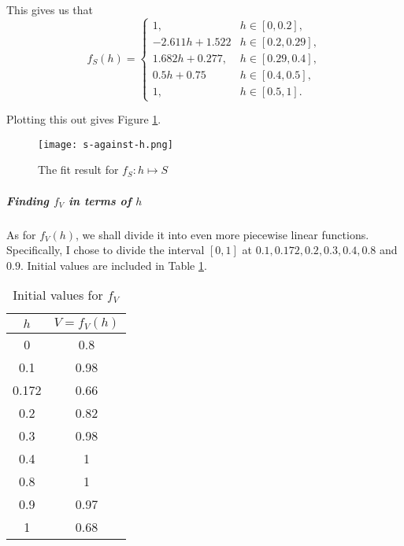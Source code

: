 This gives us that
\[
    f_S(h) = \begin{cases}
        1,              & h \in [0, 0.2],    \\
        -2.611h + 1.522 & h \in [0.2, 0.29], \\
        1.682h + 0.277, & h \in [0.29, 0.4], \\
        0.5h + 0.75     & h \in [0.4, 0.5],  \\
        1,              & h \in [0.5, 1].
    \end{cases}
\]

Plotting this out gives Figure \ref{fig:s-against-h}.

\begin{figure}[!ht]
    \centering
    \texttt{[image: s-against-h.png]}
    \caption{The fit result for \(f_S: h \mapsto S\)}
    \label{fig:s-against-h}
\end{figure}

\subparagraph{Finding \(f_V\) in terms of \(h\)}

As for \(f_V(h)\), we shall divide it into even more piecewise linear functions. Specifically, I chose to divide the interval \([0, 1]\) at \(0.1, 0.172, 0.2, 0.3, 0.4, 0.8\) and \(0.9\). Initial values are included in Table \ref{tab:v-against-h-iv}.

\begin{table}[!ht]
    \centering

    \begin{tabular}{|c|c|}
        \hline
        \(h\) & \(V = f_V(h)\) \\
        \hline
        0     & 0.8            \\
        0.1   & 0.98           \\
        0.172 & 0.66           \\
        0.2   & 0.82           \\
        0.3   & 0.98           \\
        0.4   & 1              \\
        0.8   & 1              \\
        0.9   & 0.97           \\
        1     & 0.68           \\
        \hline
    \end{tabular}
    \caption{Initial values for \(f_V\)}
    \label{tab:v-against-h-iv}
\end{table}

